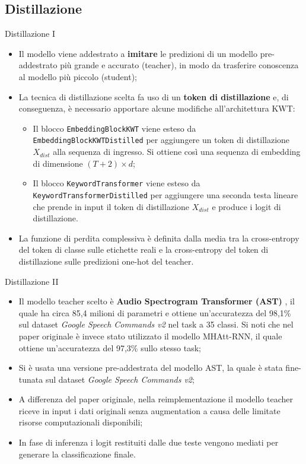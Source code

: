 \documentclass[aspectratio=169]{beamer}
\begin{document}
\subsection{Distillazione}

\begin{frame}{Distillazione I}
  \begin{itemize}
    \item Il modello viene addestrato a \textbf{imitare} le predizioni di un modello pre-addestrato più grande e accurato (teacher), in modo da trasferire conoscenza al modello più piccolo (student);
    \item La tecnica di distillazione scelta fa uso di un \textbf{token di distillazione} e, di conseguenza, è necessario apportare alcune modifiche all'architettura KWT:
    \begin{itemize}
      \item Il blocco \texttt{EmbeddingBlockKWT} viene esteso da \texttt{EmbeddingBlockKWTDistilled} per aggiungere un token di distillazione $X_{dist}$ alla sequenza di ingresso. Si ottiene così una sequenza di embedding di dimensione $(T+2) \times d$;
      \item Il blocco \texttt{KeywordTransformer} viene esteso da \texttt{KeywordTransformerDistilled} per aggiungere una seconda testa lineare che prende in input il token di distillazione $X_{dist}$ e produce i logit di distillazione.
    \end{itemize}
    \item La funzione di perdita complessiva è definita dalla media tra la cross-entropy del token di classe sulle etichette reali e la cross-entropy del token di distillazione sulle predizioni one-hot del teacher.
  \end{itemize}
\end{frame}

\begin{frame}{Distillazione II}
  \begin{itemize}
    \item Il modello teacher scelto è \textbf{Audio Spectrogram Transformer (AST)} \cite{gong2021astaudiospectrogramtransformer}, il quale ha circa 85,4 milioni di parametri e ottiene un'accuratezza del 98,1\% sul dataset \textit{Google Speech Commands v2} nel task a 35 classi. Si noti che nel paper originale è invece stato utilizzato il modello MHAtt-RNN, il quale ottiene un'accuratezza del 97,3\% sullo stesso task;
    \item Si è usata una versione pre-addestrata del modello AST, la quale è stata fine-tunata sul dataset \textit{Google Speech Commands v2};
    \item A differenza del paper originale, nella reimplementazione il modello teacher riceve in input i dati originali senza augmentation a causa delle limitate risorse computazionali disponibili;
    \item In fase di inferenza i logit restituiti dalle due teste vengono mediati per generare la classificazione finale.
  \end{itemize}
\end{frame}
\end{document}
